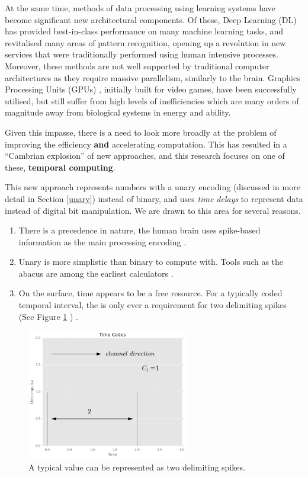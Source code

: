 \documentclass{article}
\begin{document}
At the same time, methods of data processing using learning systems have become significant new architectural components. Of these, Deep Learning (DL) \cite{lecun2015deep} has provided best-in-class performance on many machine learning tasks, and revitalised many areas of pattern recognition, opening up a revolution in new services that were traditionally performed using human intensive processes. Moreover, these methods are not well supported by traditional computer architectures \cite{JEON2021167} as they require massive parallelism, similarly to the brain. Graphics Processing Units (GPUs) , initially built for video games, have been successfully utilised, but still suffer from high levels of inefficiencies which are many orders of magnitude away from biological systems in energy and ability. 

Given this impasse, there is a need to look more broadly at the problem of improving the efficiency \textbf{and} accelerating computation. This has resulted in a ``Cambrian explosion'' \cite{hennessy2019new} of new approaches, and this research focuses on one of these, \textbf{ temporal computing}. 

This new approach represents numbers with a unary encoding (discussed in more detail in Section \ref{unary}) instead of binary, and uses \textit{time delays} to represent data instead of digital bit manipulation. We are drawn to this area for several reasons.

\begin{enumerate}
\item There is a precedence in nature, the human brain uses spike-based information as the main processing encoding \cite{victor2000brain}.
\item Unary is more simplistic than binary to compute with. Tools such as the abacus are among the earliest calculators \cite{POPPELBAUM198747}.
\item On the surface, time appears to be a free resource. For a typically coded temporal interval, the is only ever a requirement for two delimiting spikes (See Figure \ref{fig:two} ) \cite{smith2022temporal}.
\end{enumerate}

\begin{figure}[ht]
  \centering
  \includegraphics[width=200pt]{figures/logfig1.png}
  \caption{A typical value can be represented as two delimiting spikes.}
  \label{fig:two}
\end{figure}
\end{document}
